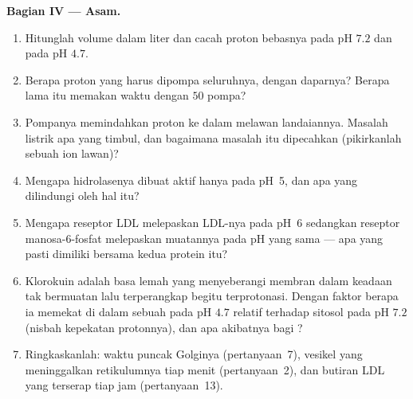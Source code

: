 \begin{problem}
\medskip
\noindent\textbf{Bagian IV --- Asam.}
\begin{enumerate}[resume]
  \item Hitunglah volume  dalam liter dan cacah proton
        bebasnya pada pH $7.2$ dan pada pH $4.7$.
  \item Berapa proton yang harus dipompa seluruhnya, dengan daparnya?
        Berapa lama itu memakan waktu dengan $50$ pompa?
  \item Pompanya memindahkan proton ke dalam melawan landaiannya. Masalah
        listrik apa yang timbul, dan bagaimana masalah itu dipecahkan
        (pikirkanlah sebuah ion lawan)?
  \item Mengapa hidrolasenya dibuat aktif hanya pada pH~5, dan apa yang
        dilindungi oleh hal itu?
  \item Mengapa reseptor LDL melepaskan LDL-nya pada pH~6 sedangkan
        reseptor manosa-6-fosfat melepaskan muatannya pada pH yang sama ---
        apa yang pasti dimiliki bersama kedua protein itu?
  \item Klorokuin adalah basa lemah yang menyeberangi membran dalam keadaan
        tak bermuatan lalu terperangkap begitu terprotonasi. Dengan faktor
        berapa ia memekat di dalam sebuah  pada pH $4.7$ relatif
        terhadap sitosol pada pH $7.2$ (nisbah kepekatan protonnya), dan apa
        akibatnya bagi ?
  \item Ringkaskanlah: waktu puncak Golginya (pertanyaan~7), vesikel yang
        meninggalkan retikulumnya tiap menit (pertanyaan~2), dan butiran
        LDL yang terserap tiap jam (pertanyaan~13).
\end{enumerate}
\end{problem}
